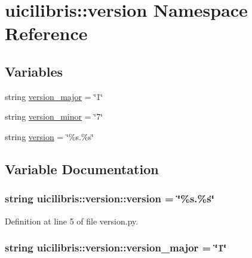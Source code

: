 \hypertarget{namespaceuicilibris_1_1version}{\section{uicilibris\-:\-:version \-Namespace \-Reference}
\label{namespaceuicilibris_1_1version}
}
\subsection*{\-Variables}
\begin{DoxyCompactItemize}
\item 
string \hyperlink{namespaceuicilibris_1_1version_a4b02363ec60fae0cb9598fa91b308e1a}{version\-\_\-major} = \char`\"{}1\char`\"{}
\item 
string \hyperlink{namespaceuicilibris_1_1version_abebe26f12f2b7b3aa2ed3878c6b4848d}{version\-\_\-minor} = \char`\"{}7\char`\"{}
\item 
string \hyperlink{namespaceuicilibris_1_1version_aa28b7695ab2f52dc9b4cb3027d3d6543}{version} = \char`\"{}\%s.\%s\char`\"{}
\end{DoxyCompactItemize}


\subsection{\-Variable \-Documentation}
\hypertarget{namespaceuicilibris_1_1version_aa28b7695ab2f52dc9b4cb3027d3d6543}{
\subsubsection[{version}]{\setlength{\rightskip}{0pt plus 5cm}string {\bf uicilibris\-::version\-::version} = \char`\"{}\%s.\%s\char`\"{}}}\label{namespaceuicilibris_1_1version_aa28b7695ab2f52dc9b4cb3027d3d6543}


\-Definition at line 5 of file version.\-py.

\hypertarget{namespaceuicilibris_1_1version_a4b02363ec60fae0cb9598fa91b308e1a}{
\subsubsection[{version\-\_\-major}]{\setlength{\rightskip}{0pt plus 5cm}string {\bf uicilibris\-::version\-::version\-\_\-major} = \char`\"{}1\char`\"{}}}\label{namespaceuicilibris_1_1version_a4b02363ec60fae0cb9598fa91b308e1a}


